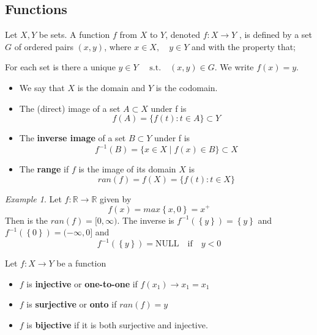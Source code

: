 \documentclass{article}
\theoremstyle{remark}
\newtheorem{example}{Example}
\begin{document}
\subsection{Functions}%
\label{sub:functions}

Let $X,Y$ be sets. A function $f$ from $X$ to $Y$, denoted $f: X \to Y$ , is defined by a set $G$ of ordered pairs $\left( x,y \right) $, where $x \in X, \quad  y \in Y  $ and with the property that;
\par
For each set is there a unique $y \in Y \quad  \text{ s.t.} \quad  \left( x,y \right) \in G $. We write $f\left( x \right) = y$. 
\begin{itemize}
  \item We say that $X$ is the domain and $Y$ is the codomain.
  \item The (direct) image of a set $ A \subset X$ under f is \[
  f\left( A \right) = \{f\left( t \right): t \in A\} \subset Y
  \] 
\item The \textbf{inverse image}  of a set $B \subset Y$ under f is \[
    f^{-1} \left(  B \right)  = \{x \in X  \mid f\left( x \right) \in B\} \subset X
\] 
\item The \textbf{range} if $f$ is the image of its domain $X$ is \[
    ran\left( f \right) = f\left( X \right) = \{f\left( t \right): t \in X\} 
\] 
\end{itemize}

\begin{example}
  Let $f: \mathbb{R}  \to \mathbb{R} $ given by \[
  f\left( x \right) = max\left\{ x,0 \right\} = x^{+}
  \] 
  Then is the $ran\left( f \right) = [0, \infty)$.  The inverse is $f^{-1} \left( \left\{ y \right\} \right) = \left\{ y \right\}$ and $f^{-1}\left( \left\{ 0 \right\} \right) = (- \infty , 0]$  and \[
  f^{-1} \left( \left\{ y \right\} \right) = \text{NULL} \quad \text{if} \quad  y < 0  
  \] 
\end{example}


\begin{definition}
  Let $f: X \to Y$ be a function
  \begin{itemize}
    \item $f$ is \textbf{injective}  or \textbf{one-to-one}  if $f\left( x_{1} \right) \to x_{1} = x_{1}$ 
    \item $f$ is \textbf{surjective}  or \textbf{onto}  if $ran\left( f \right) = y$ 
    \item $f$ is \textbf{bijective}  if it is both surjective and injective.
  \end{itemize}
\end{definition}
\end{document}
